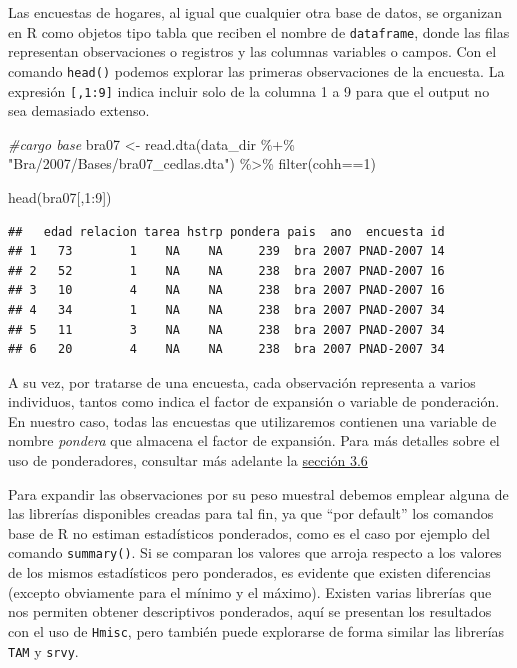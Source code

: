 \documentclass[
]{book}
\newenvironment{Shaded}{\begin{snugshade}}{\end{snugshade}}
\newcommand{\CommentTok}[1]{\textcolor[rgb]{0.56,0.35,0.01}{\textit{#1}}}
\newcommand{\DecValTok}[1]{\textcolor[rgb]{0.00,0.00,0.81}{#1}}
\newcommand{\FunctionTok}[1]{\textcolor[rgb]{0.00,0.00,0.00}{#1}}
\newcommand{\NormalTok}[1]{#1}
\newcommand{\OtherTok}[1]{\textcolor[rgb]{0.56,0.35,0.01}{#1}}
\newcommand{\SpecialCharTok}[1]{\textcolor[rgb]{0.00,0.00,0.00}{#1}}
\newcommand{\StringTok}[1]{\textcolor[rgb]{0.31,0.60,0.02}{#1}}
\begin{document}
Las encuestas de hogares, al igual que cualquier otra base de datos, se organizan en R como objetos tipo tabla que reciben el nombre de \texttt{dataframe}, donde las filas representan observaciones o registros y las columnas variables o campos. Con el comando \texttt{head()} podemos explorar las primeras observaciones de la encuesta. La expresión \texttt{{[},1:9{]}} indica incluir solo de la columna 1 a 9 para que el output no sea demasiado extenso.

\begin{Shaded}
\begin{Highlighting}[]
\CommentTok{\#cargo base}
\NormalTok{bra07 }\OtherTok{\textless{}{-}} \FunctionTok{read.dta}\NormalTok{(data\_dir }\SpecialCharTok{\%+\%} \StringTok{"Bra/2007/Bases/bra07\_cedlas.dta"}\NormalTok{) }\SpecialCharTok{\%\textgreater{}\%} 
         \FunctionTok{filter}\NormalTok{(cohh}\SpecialCharTok{==}\DecValTok{1}\NormalTok{)}

\FunctionTok{head}\NormalTok{(bra07[,}\DecValTok{1}\SpecialCharTok{:}\DecValTok{9}\NormalTok{])}
\end{Highlighting}
\end{Shaded}

\begin{verbatim}
##   edad relacion tarea hstrp pondera pais  ano  encuesta id
## 1   73        1    NA    NA     239  bra 2007 PNAD-2007 14
## 2   52        1    NA    NA     238  bra 2007 PNAD-2007 16
## 3   10        4    NA    NA     238  bra 2007 PNAD-2007 16
## 4   34        1    NA    NA     238  bra 2007 PNAD-2007 34
## 5   11        3    NA    NA     238  bra 2007 PNAD-2007 34
## 6   20        4    NA    NA     238  bra 2007 PNAD-2007 34
\end{verbatim}

A su vez, por tratarse de una encuesta, cada observación representa a varios individuos, tantos como indica el factor de expansión o variable de ponderación. En nuestro caso, todas las encuestas que utilizaremos contienen una variable de nombre \emph{pondera} que almacena el factor de expansión. Para más detalles sobre el uso de ponderadores, consultar más adelante la \protect\hyperlink{cap-3.6}{sección 3.6}

Para expandir las observaciones por su peso muestral debemos emplear alguna de las librerías disponibles creadas para tal fin, ya que ``por default'' los comandos base de R no estiman estadísticos ponderados, como es el caso por ejemplo del comando \texttt{summary()}. Si se comparan los valores que arroja respecto a los valores de los mismos estadísticos pero ponderados, es evidente que existen diferencias (excepto obviamente para el mínimo y el máximo). Existen varias librerías que nos permiten obtener descriptivos ponderados, aquí se presentan los resultados con el uso de \texttt{Hmisc}, pero también puede explorarse de forma similar las librerías \texttt{TAM} y \texttt{srvy}.
\end{document}
